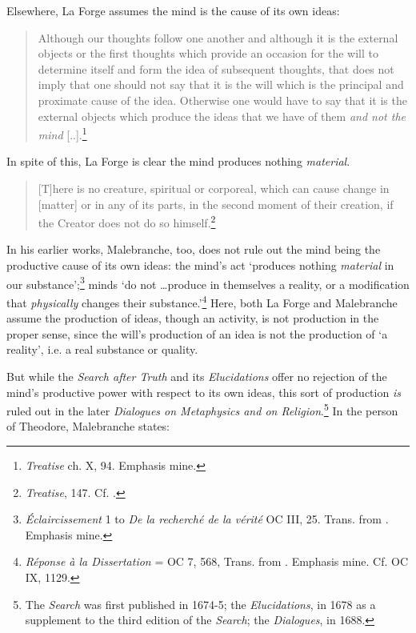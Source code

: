 \documentclass{article}
\begin{document}
Elsewhere, La Forge assumes the mind is the cause of its own ideas:

\begin{quote}
Although our thoughts follow one another and although it is the external
objects or the first thoughts which provide an occasion for the will to
determine itself and form the idea of subsequent thoughts, that does not
imply that one should not say that it is the will which is the principal
and proximate cause of the idea. Otherwise one would have to say that it
is the external objects which produce the ideas that we have of them
\emph{and not the mind} {[}..{]}.\footnote{\emph{Treatise} ch. X, 94.
  Emphasis mine.}
\end{quote}

In spite of this, La Forge is clear the mind produces nothing
\emph{material}.

\begin{quote}
{[}T{]}here is no creature, spiritual or corporeal, which can cause
change in {[}matter{]} or in any of its parts, in the second moment of
their creation, if the Creator does not do so himself.\footnote{\emph{Treatise},
  147. Cf. \autocite{Klima1993}.}
\end{quote}

In his earlier works, Malebranche, too, does not rule out the mind being
the productive cause of its own ideas: the mind's act `produces nothing
\emph{material} in our substance';\footnote{\emph{Éclaircissement} 1 to
  \emph{De la recherché de la vérité} OC III, 25. Trans. from \autocite[52]{Nadler2005}. Emphasis mine.} minds `do not \ldots produce in
themselves a reality, or a modification that \emph{physically} changes
their substance.'\footnote{\emph{Réponse à la Dissertation} = OC 7, 568,
  Trans. from \autocite[52]{Nadler2005}. Emphasis mine. Cf. OC IX, 1129.} Here,
both La Forge and Malebranche assume the production of ideas, though an
activity, is not production in the proper sense, since the will's
production of an idea is not the production of `a reality', i.e. a real
substance or quality.

But while the \emph{Search after Truth} and its \emph{Elucidations}
offer no rejection of the mind's productive power with respect to its
own ideas, this sort of production \emph{is} ruled out in the later
\emph{Dialogues on Metaphysics and on Religion}.\footnote{The
  \emph{Search} was first published in 1674-5; the \emph{Elucidations},
  in 1678 as a supplement to the third edition of the \emph{Search}; the
  \emph{Dialogues}, in 1688.} In the person of Theodore, Malebranche
states:
\end{document}
